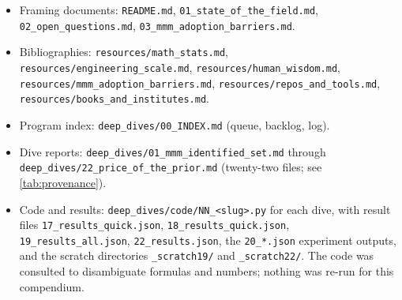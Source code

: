 \begingroup\raggedright
\begin{itemize}[leftmargin=1.2em,itemsep=1pt]
\item Framing documents: \texttt{README.md}, \texttt{01\_state\_of\_the\_field.md}, \texttt{02\_open\_questions.md}, \texttt{03\_mmm\_adoption\_barriers.md}.
\item Bibliographies: \texttt{resources/math\_stats.md}, \texttt{resources/engineering\_scale.md}, \texttt{resources/human\_wisdom.md}, \texttt{resources/mmm\_adoption\_barriers.md}, \texttt{resources/repos\_and\_tools.md}, \texttt{resources/books\_and\_institutes.md}.
\item Program index: \texttt{deep\_dives/00\_INDEX.md} (queue, backlog, log).
\item Dive reports: \texttt{deep\_dives/01\_mmm\_identified\_set.md} through \texttt{deep\_dives/22\_price\_of\_the\_prior.md} (twenty-two files; see \cref{tab:provenance}).
\item Code and results: \texttt{deep\_dives/code/NN\_<slug>.py} for each dive, with result files \texttt{17\_results\_quick.json}, \texttt{18\_results\_quick.json}, \texttt{19\_results\_all.json}, \texttt{22\_results.json}, the \texttt{20\_*.json} experiment outputs, and the scratch directories \texttt{\_scratch19/} and \texttt{\_scratch22/}. The code was consulted to disambiguate formulas and numbers; nothing was re-run for this compendium.
\end{itemize}
\endgroup

